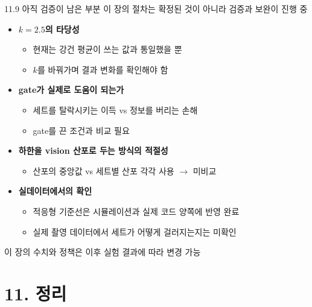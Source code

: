 \documentclass[aspectratio=169,11pt]{beamer}
\newif\ifcorrectedfk
\begin{document}
\begin{frame}{11.9 아직 검증이 남은 부분}
  이 장의 절차는 확정된 것이 아니라 검증과 보완이 진행 중
  \begin{itemize}
    \item \textbf{$k=2.5$의 타당성}
      \begin{itemize}
        \item 현재는 강건 평균이 쓰는 값과 통일했을 뿐
        \item $k$를 바꿔가며 결과 변화를 확인해야 함
      \end{itemize}
    \item \textbf{gate가 실제로 도움이 되는가}
      \begin{itemize}
        \item 세트를 탈락시키는 이득 vs 정보를 버리는 손해
        \item gate를 끈 조건과 비교 필요
      \end{itemize}
    \item \textbf{하한을 vision 산포로 두는 방식의 적절성}
      \begin{itemize}
        \item 산포의 중앙값 vs 세트별 산포 각각 사용 $\rightarrow$ 미비교
      \end{itemize}
    \item \textbf{실데이터에서의 확인}
      \begin{itemize}
        \item 적응형 기준선은 시뮬레이션과 실제 코드 양쪽에 반영 완료
        \item 실제 촬영 데이터에서 세트가 어떻게 걸러지는지는 미확인
      \end{itemize}
  \end{itemize}
  \vfill
  \centering 이 장의 수치와 정책은 이후 실험 결과에 따라 변경 가능
\end{frame}
\fi

\ifcorrectedfk\else
\section{11. 정리}
\end{document}
